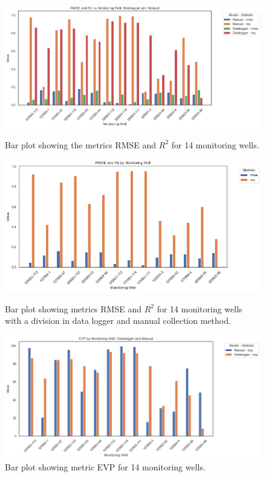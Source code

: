 \begin{figure}[htbp]
    \centering
    \begin{minipage}{0.48\textwidth}
        \centering
        \includegraphics[width=\linewidth]{frontmatter/Heijplaat-fig/rmser2heij.png}
        \caption{Bar plot showing the metrics RMSE and $R^2$ for 14 monitoring wells.}
        \label{bar1heij}
    \end{minipage}\hfill
    \begin{minipage}{0.48\textwidth}
        \centering
        \includegraphics[width=\linewidth]{frontmatter/Heijplaat-fig/rmr2heij.png}
        \caption{Bar plot showing metrics RMSE and $R^2$ for 14 monitoring wells with a division in data logger and manual collection method.}
        \label{bar2heij}
    \end{minipage}\hfill
    \begin{minipage}{0.48\textwidth}
        \centering
        \includegraphics[width=\linewidth]{frontmatter/Heijplaat-fig/evpheij.png}
        \caption{Bar plot showing metric EVP for 14 monitoring wells.}   
        \label{barevpheij}
    \end{minipage}
\end{figure}

